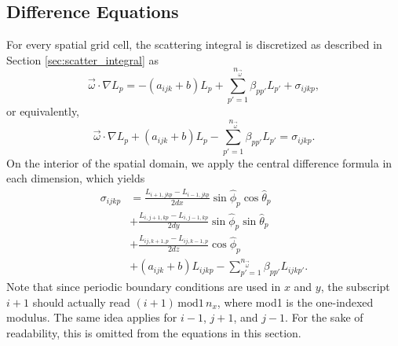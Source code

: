 \subsection{Difference Equations}
\label{sec:difference_equations}

For every spatial grid cell, the scattering integral is discretized as described in Section \ref{sec:scatter_integral} as
\begin{equation*}
  \vec{\omega} \cdot \nabla L_p = -(a_{ijk}+b) L_p + \sum_{p'=1}^{n_{\vec{\omega}}} \beta_{pp'}L_{p'} + \sigma_{ijkp},
\end{equation*}
or equivalently,
\begin{equation*}
  \vec{\omega} \cdot \nabla L_p + (a_{ijk}+b)L_p - \sum_{p'=1}^{n_{\vec{\omega}}} \beta_{pp'} L_{p'} = \sigma_{ijkp}.
\end{equation*}
On the interior of the spatial domain, we apply the central difference formula in each dimension, which yields
\begin{equation*}
  \begin{aligned}
    \sigma_{ijkp} &= \frac{L_{i+1,jkp}-L_{i-1,jkp}}{2dx}\sin\hat{\phi}_p\cos\hat{\theta}_p \\
    &+ \frac{L_{i,j+1,kp}-L_{i,j-1,kp}}{2dy}\sin\hat{\phi}_p\sin\hat{\theta}_p \\
    &+ \frac{L_{ij,k+1,p}-L_{ij,k-1,p}}{2dz}\cos\hat{\phi}_p \\
    &+ (a_{ijk}+b)L_{ijkp}  - \sum_{p'=1}^{n_{\vec{\omega}}} \beta_{pp'} L_{ijkp'}.
  \end{aligned}
\end{equation*}
Note that since periodic boundary conditions are used in $x$ and $y$,
the subscript $i+1$ should actually read $(i+1) \, \mbox{mod1}\,  n_x$, where
mod1 is the one-indexed modulus.
The same idea applies for $i-1$, $j+1$, and $j-1$.
For the sake of readability, this is omitted from the equations in this section.

